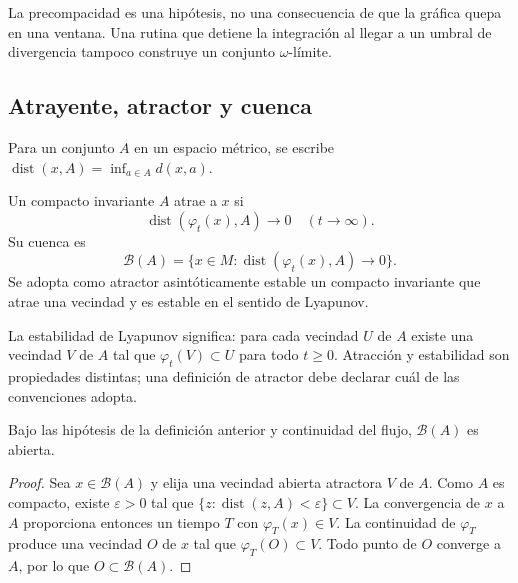 La precompacidad es una hipótesis, no una consecuencia de que la gráfica
quepa en una ventana. Una rutina que detiene la integración al llegar a un
umbral de divergencia tampoco construye un conjunto \(\omega\)-límite.

\subsection{Atrayente, atractor y cuenca}

Para un conjunto \(A\) en un espacio métrico, se escribe
\(\operatorname{dist}(x,A)=\inf_{a\in A}d(x,a)\).

\begin{definition}
Un compacto invariante \(A\) atrae a \(x\) si
\begin{equation}
 \operatorname{dist}(\varphi_t(x),A)\longrightarrow0
 \quad(t\to\infty).
 \label{geo:eq:attraction}
\end{equation}
Su cuenca es
\begin{equation}
 \mathcal B(A)=\{x\in M:
 \operatorname{dist}(\varphi_t(x),A)\to0\}.
 \label{geo:eq:basin}
\end{equation}
Se adopta como atractor asintóticamente estable un compacto invariante
que atrae una vecindad y es estable en el sentido de Lyapunov.
\end{definition}

La estabilidad de Lyapunov significa: para cada vecindad \(U\) de \(A\)
existe una vecindad \(V\) de \(A\) tal que
\(\varphi_t(V)\subset U\) para todo \(t\ge0\). Atracción y estabilidad son
propiedades distintas; una definición de atractor debe declarar cuál de las
convenciones adopta.

\begin{proposition}
Bajo las hipótesis de la definición anterior y continuidad del flujo,
\(\mathcal B(A)\) es abierta.
\end{proposition}

\begin{proof}
Sea \(x\in\mathcal B(A)\) y elija una vecindad abierta atractora \(V\)
de \(A\). Como \(A\) es compacto, existe \(\varepsilon>0\) tal que
\(\{z:\operatorname{dist}(z,A)<\varepsilon\}\subset V\).
La convergencia de \(x\) a \(A\) proporciona entonces un tiempo
\(T\) con \(\varphi_T(x)\in V\). La continuidad de
\(\varphi_T\) produce una vecindad \(O\) de \(x\) tal que
\(\varphi_T(O)\subset V\). Todo punto de \(O\) converge a \(A\), por lo que
\(O\subset\mathcal B(A)\).
\end{proof}

